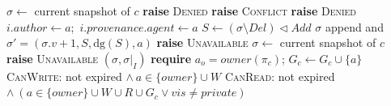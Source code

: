 \documentclass[10pt,conference]{IEEEtran}
\theoremstyle{definition}
\newcommand{\dig}{\mathrm{dg}}
\begin{document}
\begin{algorithm}[t]
\caption{Context store: authorized write, resolve, and grant}
\label{alg:store}
\small
\begin{algorithmic}[1]
  \State $\sigma\gets$ current snapshot of $c$ 
   \textbf{raise} \textsc{Denied}
  \EndIf
   \textbf{raise} \textsc{Conflict} 
  \EndIf
   
     \textbf{raise} \textsc{Denied}
    \EndIf
    \State $i.\mathit{author}\gets a$;\ $i.\mathit{provenance.agent}\gets a$
  \EndFor
  \State $S\gets(\sigma\setminus\mathit{Del})\lhd\mathit{Add}$ 
  \If{$\dig(S)=\dig(\sigma)$} \Return $\sigma$ 
  \EndIf
  \State append and \Return $\sigma'=(\sigma.v{+}1, S, \dig(S), a)$
\EndFunction
{}
   \textbf{raise} \textsc{Unavailable}
  \EndIf
  \State $\sigma\gets$ current snapshot of $c$
   \textbf{raise} \textsc{Unavailable}
  \EndIf
  \State \Return $(\sigma, \sigma|_I)$
\EndFunction
{} \textbf{require} $a_o=\mathit{owner}(\pi_c)$; $G_c\gets G_c\cup\{a\}$
\EndFunction
\Statex \textsc{CanWrite}: not expired $\wedge\ a\in\{\mathit{owner}\}\cup W$
\Statex \textsc{CanRead}: not expired $\wedge\ (a\in\{\mathit{owner}\}\cup W\cup R\cup G_c\vee\mathit{vis}\neq\mathit{private})$
\end{algorithmic}
\end{algorithm}
\end{document}
